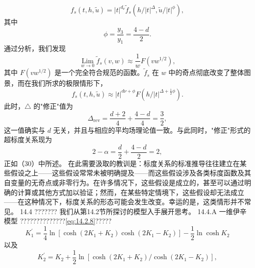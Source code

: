 \begin{equation}\tag{14.3.30}\label{eq:14.3.30}
f _ { s } ( t , h , \tilde { u } ) = | t | ^{d _ { \nu} } \tilde { f } _ { s } ( h / | t | ^{\Delta} , \tilde { u } / | t | ^{\phi} ) ,
\end{equation}
其中
\begin{equation}\tag{14.3.31}\label{eq:14.3.31}
\phi = \frac { y _ { 3 } } { y _ { 1 } } = \frac { 4 - d } { 2 } .
\end{equation}
通过分析，我们发现
\begin{equation}\tag{14.3.32}\label{eq:14.3.32}
\operatorname * { L i m } _ { w \rightarrow 0 } \tilde { f } _ { s } ( v , w ) \approx \frac { 1 } { w } F ( v w ^{1 / 2} ) ,
\end{equation}
其中 \(F(vw^{1/2})\) 是一个完全符合规范的函数。\(\tilde{f}_s\) 在 \(w\) 中的奇点彻底改变了整体图景，而在我们所求的极限情形下，
\begin{equation}\tag{14.3.33}\label{eq:14.3.33}
f _ { s } ( t , h , \tilde { u } ) \approx | t | ^{d \nu + \phi} F \left( h / | t | ^{\Delta + \frac { 1} { 2 } \phi } \right) .
\end{equation}
此时，\(\triangle\) 的"修正"值为
\begin{equation}\tag{14.3.34}\label{eq:14.3.34}
\Delta _ { \mathrm { r e v } } = \frac { d + 2 } { 4 } + \frac { 4 - d } { 4 } = \frac { 3 } { 2 } ,
\end{equation}
这一值确实与 \(d\) 无关，并且与相应的平均场理论值一致。与此同时，"修正"形式的超标度关系现为
\begin{equation}\tag{14.3.35}\label{eq:14.3.35}
2 - \alpha = { \frac { d } { 2 } } + { \frac { 4 - d } { 2 } } = 2 ,
\end{equation}
正如（30）中所述。
在此需要汲取的教训是：标度关系的标准推导往往建立在某些假设之上——这些假设常常未被明确提及——而这些假设涉及各类标度函数及其自变量的无奇点或非零行为。在许多情况下，这些假设是成立的，甚至可以通过明确的计算或其他方式加以验证；然而，在某些特定情境下，这些假设却无法成立——在这种情况下，标度关系的形态可能会发生改变。幸运的是，这类情形并不常见。
14.4 ???????
我们从第14.2节所探讨的模型入手展开思考。
14.4.A 一维伊辛模型
??????????????\autoref{eq:14.2.8}?????
\begin{equation}\tag{14.4.1}\label{eq:14.4.1}
K _ { 1 } ^{\prime} = \frac { 1 } { 4 } \ln [ \cosh ( 2 K _ { 1 } + K _ { 2 } ) \cosh ( 2 K _ { 1 } - K _ { 2 } ) ] - \frac { 1 } { 2 } \ln \cosh K _ { 2 }
\end{equation}
以及
\begin{equation}\tag{14.4.2}\label{eq:14.4.2}
K _ { 2 } ^{\prime} = K _ { 2 } + \frac { 1 } { 2 } \ln [ \cosh ( 2 K _ { 1 } + K _ { 2 } ) / \cosh ( 2 K _ { 1 } - K _ { 2 } ) ] ,
\end{equation}
